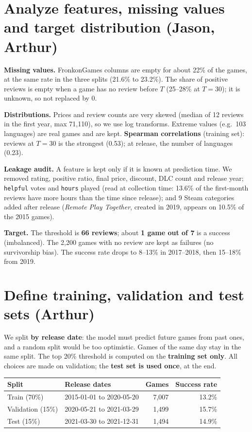 \documentclass[11pt,a4paper]{article}
\newcommand{\code}[1]{\texttt{#1}}
\begin{document}
\section{Analyze features, missing values and target distribution (Jason, Arthur)}

\textbf{Missing values.} FronkonGames columns are empty for about 22\% of the games, at the same rate in the three splits (21.6\% to 23.2\%).
The share of positive reviews is empty when a game has no review before $T$ (25--28\% at $T = 30$); it is unknown, so not replaced by 0.

\textbf{Distributions.} Prices and review counts are very skewed (median of 12 reviews in the first year, max 71,110), so we use log transforms.
Extreme values (e.g.\ 103 languages) are real games and are kept.
\textbf{Spearman correlations} (training set): reviews at $T = 30$ is the strongest (0.53); at release, the number of languages (0.23).

\textbf{Leakage audit.} A feature is kept only if it is known at prediction time. We removed rating, positive ratio, final price,
discount, DLC count and release year; \code{helpful} votes and \code{hours} played (read at collection time: 13.6\% of the
first-month reviews have more hours than the time since release); and 9 Steam categories added after release
(\emph{Remote Play Together}, created in 2019, appears on 10.5\% of the 2015 games).

\textbf{Target.} The threshold is \textbf{66 reviews}; about \textbf{1 game out of 7} is a success (imbalanced).
The 2,200 games with no review are kept as failures (no survivorship bias). The success rate drops to 8--13\% in 2017--2018, then 15--18\% from 2019.

\section{Define training, validation and test sets (Arthur)}

We split \textbf{by release date}: the model must predict future games from past ones, and a random split would be too optimistic.
Games of the same day stay in the same split. The top 20\% threshold is computed on the \textbf{training set only}.
All choices are made on validation; the \textbf{test set is used once}, at the end.

\begin{center}
\small
\begin{tabular}{l l r r}
\toprule
Split & Release dates & Games & Success rate \\
\midrule
Train (70\%) & 2015-01-01 to 2020-05-20 & 7,007 & 13.2\% \\
Validation (15\%) & 2020-05-21 to 2021-03-29 & 1,499 & 15.7\% \\
Test (15\%) & 2021-03-30 to 2021-12-31 & 1,494 & 14.9\% \\
\bottomrule
\end{tabular}
\end{center}
\end{document}
